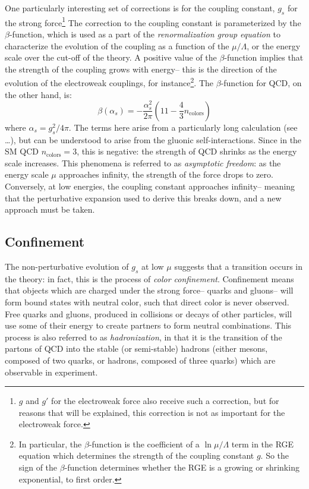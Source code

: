 One particularly interesting set of corrections is for the coupling constant, $g_s$ for the strong force\footnote{$g$ and $g'$ for the electroweak force also receive such a correction, but for reasons that will be explained, this correction is not as important for the electroweak force.} The correction to the coupling constant is parameterized by the $\beta$-function, which is used as a part of the \textit{renormalization group equation} to characterize the evolution of the coupling as a function of the $\mu/\Lambda$, or the energy scale over the cut-off of the theory. A positive value of the $\beta$-function implies that the strength of the coupling grows with energy-- this is the direction of the evolution of the electroweak couplings, for instance\footnote{In particular, the $\beta$-function is the coefficient of a $\ln{\mu/\Lambda}$ term in the RGE equation which determines the strength of the coupling constant $g$. So the sign of the $\beta$-function determines whether the RGE is a growing or shrinking exponential, to first order.}. The $\beta$-function for QCD, on the other hand, is:
%
\begin{equation}
\beta(\alpha_s) = - \frac{\alpha_s^2}{2\pi} \left(11 - \frac{4}{3}n_\mathrm{colors}\right)
\end{equation} 
%
where $\alpha_s = g_s^2 / 4\pi$. The terms here arise from a particularly long calculation (see \ldots), but can be understood to arise from the gluonic self-interactions. Since in the SM QCD $n_\mathrm{colors} = 3$, this is negative: the strength of QCD shrinks as the energy scale increases. This phenomena is referred to as \textit{asymptotic freedom}: as the energy scale $\mu$ approaches infinity, the strength of the force drops to zero. Conversely, at low energies, the coupling constant approaches infinity-- meaning that the perturbative expansion used to derive this breaks down, and a new approach must be taken. 

\subsection{Confinement}

The non-perturbative evolution of $g_s$ at low $\mu$ suggests that a transition occurs in the theory: in fact, this is the process of \textit{color confinement}. Confinement means that objects which are charged under the strong force-- quarks and gluons-- will form bound states with neutral color, such that direct color is never observed. Free quarks and gluons, produced in collisions or decays of other particles, will use some of their energy to create partners to form neutral combinations. This process is also referred to as \textit{hadronization}, in that it is the transition of the partons of QCD into the stable (or semi-stable) hadrons (either mesons, composed of two quarks, or hadrons, composed of three quarks) which are observable in experiment. 

